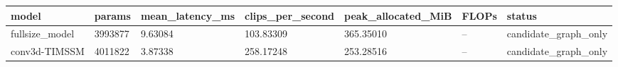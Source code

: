 \begin{tabular}{lllllll}
\hline
model & params & mean\_latency\_ms & clips\_per\_second & peak\_allocated\_MiB & FLOPs & status \\
\hline
fullsize\_model & 3993877 & 9.63084 & 103.83309 & 365.35010 & -- & candidate\_graph\_only \\
conv3d-TIMSSM & 4011822 & 3.87338 & 258.17248 & 253.28516 & -- & candidate\_graph\_only \\
\hline
\end{tabular}
